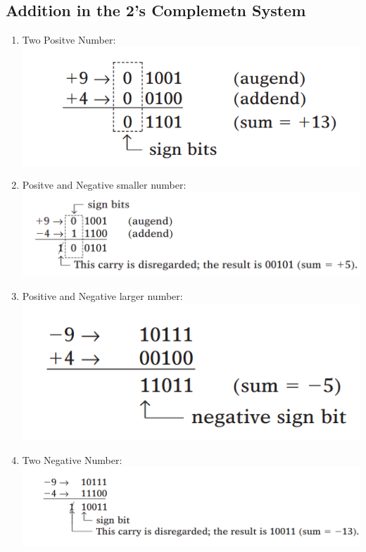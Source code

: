 \documentclass[12pt]{article}
\begin{document}
\subsection{Addition in the 2's Complemetn System}
\begin{enumerate}
	\item Two Positve Number: \\
	\includegraphics[scale = 0.6]{hinh25}
	\item Positve and Negative smaller number: \\
	\includegraphics[scale = 0.6]{hinh26}
	\item Positive and Negative larger number: \\
	\includegraphics[scale = 0.6]{hinh29}
	\item Two Negative Number: \\
	\includegraphics[scale = 0.6]{hinh27}
\end{enumerate}
\end{document}
